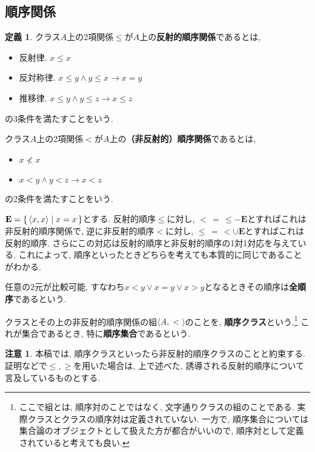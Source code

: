 \documentclass[a4paper, twoside]{bxjsarticle}
\theoremstyle{definition}
\newtheorem{defn}[thm]{定義}
\newtheorem{rem}[thm]{注意}
\begin{document}
    \subsection{順序関係}
        \begin{defn}
            クラス$A$上の2項関係$\leq$が$A$上の\textbf{反射的順序関係}であるとは, 
            \begin{itemize}
                \item 反射律. $x\leq x$
                \item 反対称律. $x\leq y \land y\leq x \to x=y$
                \item 推移律. $x\leq y \land y\leq z \to x\leq z$
            \end{itemize}
            の3条件を満たすことをいう. 
            
            クラス$A$上の2項関係$<$が$A$上の\textbf{（非反射的）順序関係}であるとは, 
            \begin{itemize}
                \item $x\not < x$
                \item $x<y\land y<z \to x<z$
            \end{itemize}
            の2条件を満たすことをいう.
            
            $\textbf{E} = \set{\langle x, x\rangle|x=x}$とする.
            反射的順序$\leq$に対し, $< \,=\, \leq - \textbf{E}$とすればこれは非反射的順序関係で, 逆に非反射的順序$<$に対し, $\leq \,=\, < \cup \textbf{E}$とすればこれは反射的順序. さらにこの対応は反射的順序と非反射的順序の1対1対応を与えている. これによって, 順序といったときどちらを考えても本質的に同じであることがわかる.
            
            任意の2元が比較可能, すなわち$x < y \lor x = y \lor x > y$となるときその順序は\textbf{全順序}であるという.
            
            クラスとその上の非反射的順序関係の組$\langle A, <\rangle$のことを, \textbf{順序クラス}という.\footnote{ここで組とは, 順序対のことではなく, 文字通りクラスの組のことである. 実際クラスとクラスの順序対は定義されていない. 一方で, 順序集合については集合論のオブジェクトとして扱えた方が都合がいいので, 順序対として定義されていると考えても良い.} これが集合であるとき, 特に\textbf{順序集合}であるという.
        \begin{rem}
            本稿では, 順序クラスといったら非反射的順序クラスのことと約束する. 証明などで$\leq, \geq$を用いた場合は, 上で述べた, 誘導される反射的順序について言及しているものとする.
        \end{rem}
        \end{defn}
\end{document}
